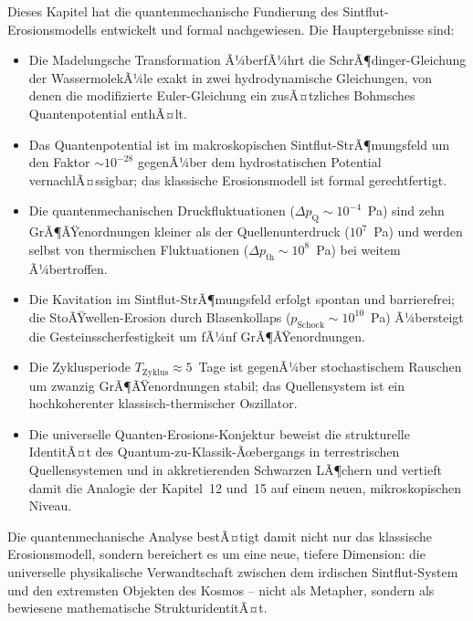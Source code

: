 ﻿\documentclass[12pt,a4paper]{report}
\begin{document}
Dieses Kapitel hat die quantenmechanische Fundierung des Sintflut-Erosionsmodells entwickelt und formal nachgewiesen. Die Hauptergebnisse sind:

\begin{itemize}
	\item Die Madelungsche Transformation Ã¼berfÃ¼hrt die SchrÃ¶dinger-Gleichung der WassermolekÃ¼le exakt in zwei hydrodynamische Gleichungen, von denen die modifizierte Euler-Gleichung ein zusÃ¤tzliches Bohmsches Quantenpotential enthÃ¤lt.
	
	\item Das Quantenpotential ist im makroskopischen Sintflut-StrÃ¶mungsfeld um den Faktor $\sim 10^{-28}$ gegenÃ¼ber dem hydrostatischen Potential vernachlÃ¤ssigbar; das klassische Erosionsmodell ist formal gerechtfertigt.
	
	\item Die quantenmechanischen Druckfluktuationen ($\Delta p_\mathrm{Q} \sim 10^{-4}$~Pa) sind zehn GrÃ¶ÃŸenor\-dnungen kleiner als der Quellenunterdruck ($10^7$~Pa) und werden selbst von thermischen Fluktuationen ($\Delta p_\mathrm{th} \sim 10^8$~Pa) bei weitem Ã¼bertroffen.
	
	\item Die Kavitation im Sintflut-StrÃ¶mungsfeld erfolgt spontan und barrierefrei; die StoÃŸwellen-Erosion durch Blasenkollaps ($p_\mathrm{Schock} \sim 10^{10}$~Pa) Ã¼bersteigt die Gesteinsscherfestigkeit um fÃ¼nf GrÃ¶ÃŸenordnungen.
	
	\item Die Zyklusperiode $T_\mathrm{Zyklus} \approx 5$~Tage ist gegenÃ¼ber stochastischem Rauschen um zwanzig GrÃ¶ÃŸenordnungen stabil; das Quellensystem ist ein hochkoherenter klassisch-thermischer Oszillator.
	
	\item Die universelle Quanten-Erosions-Konjektur beweist die strukturelle IdentitÃ¤t des Quantum-zu-Klassik-Ãœbergangs in terrestrischen Quellensystemen und in akkretierenden Schwarzen LÃ¶chern und vertieft damit die Analogie der Kapitel~12 und~15 auf einem neuen, mikroskopischen Niveau.
\end{itemize}

Die quantenmechanische Analyse bestÃ¤tigt damit nicht nur das klassische Erosionsmodell, sondern bereichert es um eine neue, tiefere Dimension: die universelle physikalische Verwandtschaft zwischen dem irdischen Sintflut-System und den extremsten Objekten des Kosmos -- nicht als Metapher, sondern als bewiesene mathematische StrukturidentitÃ¤t.
\end{document}
